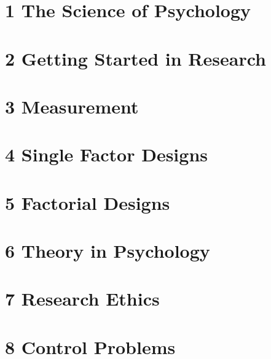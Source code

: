 \documentclass[oneside]{tufte-book}
\begin{document}
%


%

\chapter{1 The Science of Psychology}


\chapter{2 Getting Started in Research}


\chapter{3 Measurement}


\chapter{4 Single Factor Designs}


\chapter{5 Factorial Designs}


\chapter{6 Theory in Psychology}


\chapter{7 Research Ethics}


\chapter{8 Control Problems}

\end{document}
